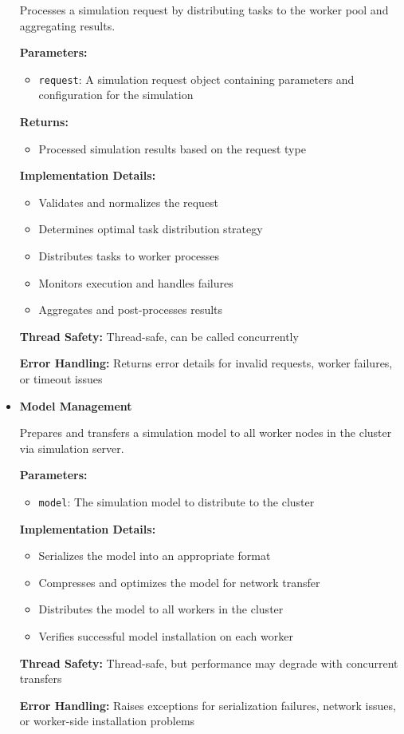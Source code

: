 \begin{itemize}

	Processes a simulation request by distributing tasks to the worker pool and aggregating results.

	\textbf{Parameters:}
	\begin{itemize}
		\item \texttt{request}: A simulation request object containing parameters and configuration for the simulation
	\end{itemize}

	\textbf{Returns:}
	\begin{itemize}
		\item Processed simulation results based on the request type
	\end{itemize}

	\textbf{Implementation Details:}
	\begin{itemize}
		\item Validates and normalizes the request
		\item Determines optimal task distribution strategy
		\item Distributes tasks to worker processes
		\item Monitors execution and handles failures
		\item Aggregates and post-processes results
	\end{itemize}

	\textbf{Thread Safety:} Thread-safe, can be called concurrently

	\textbf{Error Handling:} Returns error details for invalid requests, worker failures, or timeout issues

	\item \textbf{Model Management}


	Prepares and transfers a simulation model to all worker nodes in the cluster via simulation server.

	\textbf{Parameters:}
	\begin{itemize}
		\item \texttt{model}: The simulation model to distribute to the cluster
	\end{itemize}

	\textbf{Implementation Details:}
	\begin{itemize}
		\item Serializes the model into an appropriate format
		\item Compresses and optimizes the model for network transfer
		\item Distributes the model to all workers in the cluster
		\item Verifies successful model installation on each worker
	\end{itemize}

	\textbf{Thread Safety:} Thread-safe, but performance may degrade with concurrent transfers

	\textbf{Error Handling:} Raises exceptions for serialization failures, network issues, or worker-side installation problems

\end{itemize}

